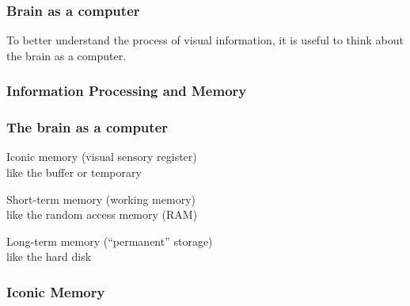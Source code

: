 \documentclass[12pt]{beamer}\usepackage[]{graphicx}\usepackage[]{color}
\begin{document}

\begin{frame}
\frametitle{Brain as a computer}

To better understand the process of visual information, it is useful 
to think about the brain as a computer.
\eb

\end{frame}


\begin{frame}
\begin{center}
\Huge{}
\end{center}
\end{frame}


\begin{frame}
\frametitle{Information Processing and Memory}
\begin{center}
\end{center}
\end{frame}


\begin{frame}
\frametitle{The brain as a computer}

\bbi
  \item Iconic memory (visual sensory register) \\
  {\lolit like the buffer or temporary}
  \item Short-term memory (working memory) \\
  {\lolit like the random access memory (RAM)}
  \item Long-term memory (``permanent'' storage) \\
  {\lolit like the hard disk}
\ei
\eb

\end{frame}


\begin{frame}
\frametitle{Iconic Memory}
\begin{center}
\end{center}
\end{frame}
\end{document}

